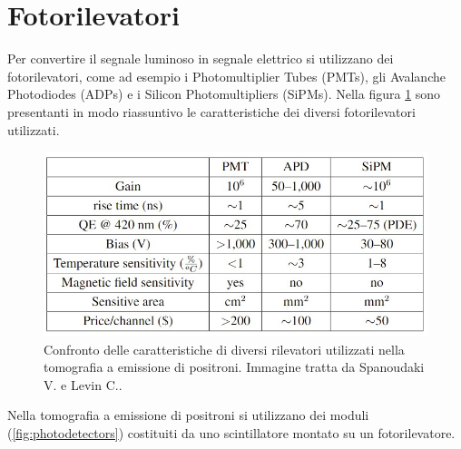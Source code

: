 \section{Fotorilevatori}
Per convertire il segnale luminoso in segnale elettrico si utilizzano dei fotorilevatori, come ad esempio i Photomultiplier Tubes (PMTs), gli Avalanche Photodiodes (ADPs) e i Silicon Photomultipliers (SiPMs). Nella figura \ref{fig:photodetectors_performance} sono presentanti in modo riassuntivo le caratteristiche dei diversi fotorilevatori utilizzati.
\begin{figure}[tbh]
	\centering
	\includegraphics[width=0.7\linewidth]{./ImageFiles/table_pet_detectors_properties.jpg}
	\caption{Confronto delle caratteristiche di diversi rilevatori utilizzati nella tomografia a emissione di positroni. Immagine tratta da Spanoudaki V. e Levin C.\cite{Spanoudaki2010}.} 
	\label{fig:photodetectors_performance}
\end{figure}
Nella tomografia a emissione di positroni si utilizzano dei moduli (\Fig\ref{fig:photodetectors}) costituiti da uno scintillatore montato su un fotorilevatore.
